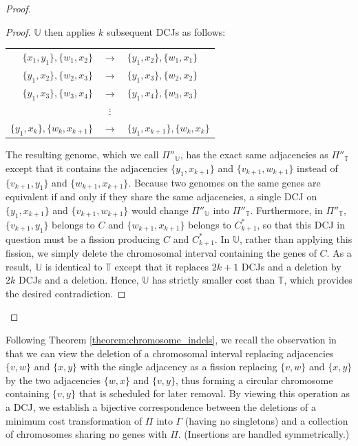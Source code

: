 \begin{proof}
\begin{proof}
\noindent $\mathbb{U}$ then applies $k$ subsequent DCJs as follows:

\begin{center}
\begin{tabular}{r c l}
$\{x_1, y_1\}, \{w_1, x_2\}$ &  $\rightarrow$ & $\{y_1, x_2\}, \{w_1, x_1\}$\\
$\{y_1, x_2\}, \{w_2, x_3\}$ &  $\rightarrow$ & $\{y_1, x_3\}, \{w_2, x_2\}$\\
$\{y_1, x_3\}, \{w_3, x_4\}$ & $\rightarrow$ & $\{y_1, x_4\}, \{w_3, x_3\}$\\
& $\vdots$ & \\
$\{y_1, x_k\}, \{w_k, x_{k+1}\}$ & $\rightarrow$ & $\{y_1, x_{k+1}\}, \{w_k, x_k\}$
\end{tabular}
\end{center}

The resulting genome, which we call $\Pi''_{\mathbb{U}}$, has the exact same adjacencies as $\Pi''_{\mathbb{T}}$ except that it contains the adjacencies $\{y_1, x_{k+1}\}$ and $\{v_{k+1}, w_{k+1}\}$ instead of $\{v_{k+1}, y_1\}$ and $\{w_{k+1}, x_{k+1}\}$.  Because two genomes on the same genes are equivalent if and only if they share the same adjacencies, a single DCJ on $\{y_1, x_{k+1}\}$ and $\{v_{k+1}, w_{k+1}\}$ would change $\Pi''_{\mathbb{U}}$ into $\Pi''_{\mathbb{T}}$.  Furthermore, in $\Pi''_{\mathbb{T}}$, $\{v_{k+1}, y_1\}$ belongs to $C$ and $\{w_{k+1}, x_{k+1}\}$ belongs to $C^{*}_{k+1}$, so that this DCJ in question must be a fission producing $C$ and $C^{*}_{k+1}$. In $\mathbb{U}$, rather than applying this fission, we simply delete the chromosomal interval containing the genes of $C$. As a result, $\mathbb{U}$ is identical to $\mathbb{T}$ except that it replaces $2k + 1$ DCJs and a deletion by $2k$ DCJs and a deletion. Hence, $\mathbb{U}$ has strictly smaller cost than $\mathbb{T}$, which provides the desired contradiction.
\end{proof}
\end{proof}

\noindent Following Theorem \ref{theorem:chromosome_indels}, we recall the observation in \cite{arndt} that we can view the deletion of a chromosomal interval replacing adjacencies $\{v, w\}$ and $\{x, y\}$ with the single adjacency as a fission replacing $\{v, w\}$ and $\{x, y\}$ by the two adjacencies $\{w, x\}$ and $\{v, y\}$, thus forming a circular chromosome containing $\{v, y\}$ that is scheduled for later removal. By viewing this operation as a DCJ, we establish a bijective correspondence between the deletions of a minimum cost transformation of $\Pi$ into $\Gamma$ (having no singletons) and a collection of chromosomes sharing no genes with $\Pi$.  (Insertions are handled symmetrically.)

